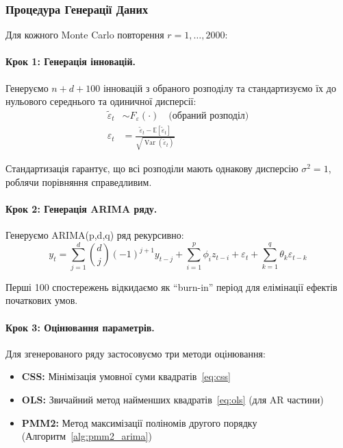 \documentclass[12pt,a4paper]{article}
\DeclareMathOperator{\Var}{Var}
\newcommand{\E}{\mathbb{E}}
\begin{document}
\subsubsection{Процедура Генерації Даних}

Для кожного Monte Carlo повторення $r = 1, \ldots, 2000$:

\paragraph{Крок 1: Генерація інновацій.}

Генеруємо $n + d + 100$ інновацій з обраного розподілу та стандартизуємо їх до нульового середнього та одиничної дисперсії:
\begin{align}
\tilde{\varepsilon}_t &\sim F_{\varepsilon}(\cdot) \quad \text{(обраний розподіл)} \label{eq:raw_innovations} \\
\varepsilon_t &= \frac{\tilde{\varepsilon}_t - \E[\tilde{\varepsilon}_t]}{\sqrt{\Var(\tilde{\varepsilon}_t)}} \label{eq:standardized_innovations}
\end{align}

Стандартизація гарантує, що всі розподіли мають однакову дисперсію $\sigma^2 = 1$, роблячи порівняння справедливим.

\paragraph{Крок 2: Генерація ARIMA ряду.}

Генеруємо ARIMA(p,d,q) ряд рекурсивно:
\begin{equation}
\label{eq:arima_generation}
y_t = \sum_{j=1}^{d} \binom{d}{j} (-1)^{j+1} y_{t-j} + \sum_{i=1}^{p} \phi_i z_{t-i} + \varepsilon_t + \sum_{k=1}^{q} \theta_k \varepsilon_{t-k}
\end{equation}

Перші 100 спостережень відкидаємо як ``burn-in'' період для елімінації ефектів початкових умов.

\paragraph{Крок 3: Оцінювання параметрів.}

Для згенерованого ряду застосовуємо три методи оцінювання:
\begin{itemize}
    \item \textbf{CSS:} Мінімізація умовної суми квадратів~\eqref{eq:css}
    \item \textbf{OLS:} Звичайний метод найменших квадратів~\eqref{eq:ols} (для AR частини)
    \item \textbf{PMM2:} Метод максимізації поліномів другого порядку (Алгоритм~\ref{alg:pmm2_arima})
\end{itemize}
\end{document}

